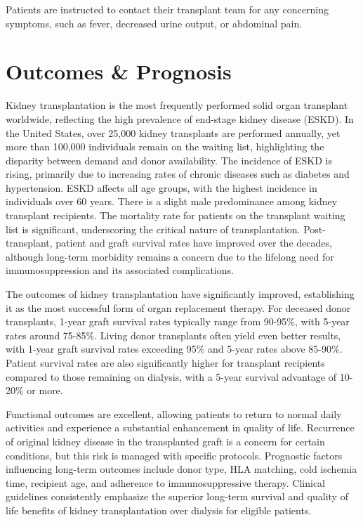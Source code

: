Patients are instructed to contact their transplant team for any concerning symptoms, such as fever, decreased urine output, or abdominal pain.

\section*{Outcomes \& Prognosis}
Kidney transplantation is the most frequently performed solid organ transplant worldwide, reflecting the high prevalence of end-stage kidney disease (ESKD). In the United States, over 25,000 kidney transplants are performed annually, yet more than 100,000 individuals remain on the waiting list, highlighting the disparity between demand and donor availability. The incidence of ESKD is rising, primarily due to increasing rates of chronic diseases such as diabetes and hypertension. ESKD affects all age groups, with the highest incidence in individuals over 60 years. There is a slight male predominance among kidney transplant recipients. The mortality rate for patients on the transplant waiting list is significant, underscoring the critical nature of transplantation. Post-transplant, patient and graft survival rates have improved over the decades, although long-term morbidity remains a concern due to the lifelong need for immunosuppression and its associated complications.

The outcomes of kidney transplantation have significantly improved, establishing it as the most successful form of organ replacement therapy. For deceased donor transplants, 1-year graft survival rates typically range from 90-95\%, with 5-year rates around 75-85\%. Living donor transplants often yield even better results, with 1-year graft survival rates exceeding 95\% and 5-year rates above 85-90\%. Patient survival rates are also significantly higher for transplant recipients compared to those remaining on dialysis, with a 5-year survival advantage of 10-20\% or more.

Functional outcomes are excellent, allowing patients to return to normal daily activities and experience a substantial enhancement in quality of life. Recurrence of original kidney disease in the transplanted graft is a concern for certain conditions, but this risk is managed with specific protocols. Prognostic factors influencing long-term outcomes include donor type, HLA matching, cold ischemia time, recipient age, and adherence to immunosuppressive therapy. Clinical guidelines consistently emphasize the superior long-term survival and quality of life benefits of kidney transplantation over dialysis for eligible patients.

